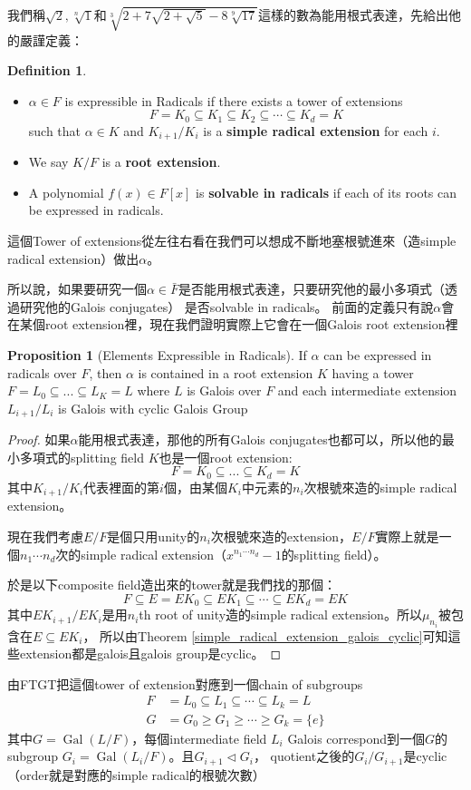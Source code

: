 \documentclass[12pt]{article}
\theoremstyle{definition}
\newtheorem{dfn}{Definition}
\newtheorem{prop}{Proposition}
\newcommand{\cbrt}[1]{\sqrt[3]{#1}}
\DeclareMathOperator{\Gal}{Gal}
\begin{document}
我們稱$\sqrt{2}, \sqrt[n]{1}$和$\cbrt{2+7\sqrt{2+\sqrt5}-8\sqrt[9]{17}}$這樣的數為能用根式表達，先給出他的嚴謹定義：
\begin{dfn}
	\begin{itemize}
		\item 	$\alpha\in F$ is expressible in Radicals if there exists a tower of extensions
		      \[F=K_0 \subseteq K_1 \subseteq K_2 \subseteq \cdots \subseteq K_d=K \]
		      such that $\alpha\in K$ and $K_{i+1}/K_i$ is a \textbf{simple radical extension} for each $i$.
		\item We say $K/F$ is a \textbf{root extension}.
		\item A polynomial $f(x)\in F[x]$ is \textbf{solvable in radicals} if each of its roots can be expressed in radicals.
	\end{itemize}
\end{dfn}
這個Tower of extensions從左往右看在我們可以想成不斷地塞根號進來（造simple radical extension）做出$\alpha$。

所以說，如果要研究一個$\alpha\in\bar{F}$是否能用根式表達，只要研究他的最小多項式（透過研究他的Galois conjugates）
是否solvable in radicals。
前面的定義只有說$\alpha$會在某個root extension裡，現在我們證明實際上它會在一個Galois root extension裡
\begin{prop}[Elements Expressible in Radicals]
	If $\alpha$ can be expressed in radicals over $F$, then $\alpha$ is contained in a root extension $K$ having
	a tower $F=L_0\subseteq ...\subseteq L_K=L$ where $L$ is Galois over $F$ and each intermediate extension $L_{i+1}/L_i$
	is Galois with cyclic Galois Group
\end{prop}

\begin{proof}
	如果$\alpha$能用根式表達，那他的所有Galois conjugates也都可以，所以他的最小多項式的splitting field $K$也是一個root extension:
	\[F=K_0\subseteq...\subseteq K_d=K\]
	其中$K_{i+1}/K_i$代表裡面的第$i$個，由某個$K_i$中元素的$n_i$次根號來造的simple radical extension。

	現在我們考慮$E/F$是個只用unity的$n_i$次根號來造的extension，$E/F$實際上就是一個$n_1\cdots n_d$次的simple radical extension（$x^{n_1\cdots n_d}-1$的splitting field）。

	於是以下composite field造出來的tower就是我們找的那個：
	\[F\subseteq E=EK_0\subseteq EK_1 \subseteq \cdots \subseteq EK_d = EK \]
	其中$EK_{i+1}/EK_i$是用$n_i$th root of unity造的simple radical extension。所以$\mu_{n_i}$被包含在$E\subseteq EK_i$，
	所以由Theorem \ref{simple_radical_extension_galois_cyclic}可知這些extension都是galois且galois group是cyclic。
\end{proof}
由FTGT把這個tower of extension對應到一個chain of subgroups
\begin{align*}
	F & =L_0\subseteq L_1\subseteq \cdots \subseteq L_k=L \\
	G & =G_0\ge G_1 \ge \cdots \ge G_k=\{e\}
\end{align*}
其中$G=\Gal(L/F)$，每個intermediate field $L_i$ Galois correspond到一個$G$的subgroup $G_i=\Gal(L_i/F)$。且$G_{i+1}\lhd G_i$，
quotient之後的$G_i/G_{i+1}$是cyclic（order就是對應的simple radical的根號次數）
\end{document}
